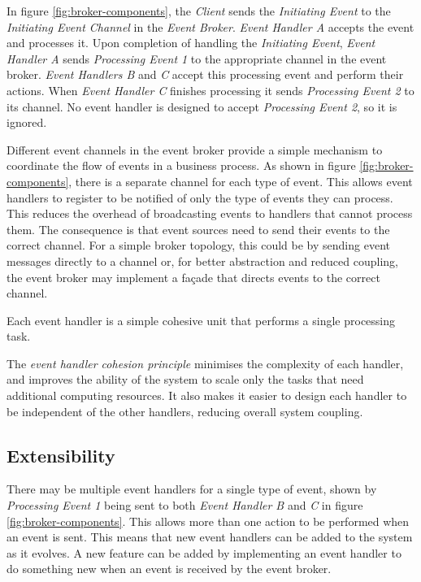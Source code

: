 In figure \ref{fig:broker-components}, the \emph{Client} sends the \emph{Initiating Event} to the \emph{Initiating Event Channel} in the \emph{Event Broker}.
\emph{Event Handler A} accepts the event and processes it.
Upon completion of handling the \emph{Initiating Event},
\emph{Event Handler A} sends \emph{Processing Event 1} to the appropriate channel in the event broker.
\emph{Event Handlers B} and \emph{C} accept this processing event and perform their actions.
When \emph{Event Handler C} finishes processing it sends \emph{Processing Event 2} to its channel.
No event handler is designed to accept \emph{Processing Event 2}, so it is ignored.

Different event channels in the event broker provide a simple mechanism to coordinate the flow of events in a business process.
As shown in figure \ref{fig:broker-components}, there is a separate channel for each type of event.
This allows event handlers to register to be notified of only the type of events they can process.
This reduces the overhead of broadcasting events to handlers that cannot process them.
The consequence is that event sources need to send their events to the correct channel.
For a simple broker topology, this could be by sending event messages directly to a channel
or, for better abstraction and reduced coupling, the event broker may implement a façade that directs events to the correct channel.

\begin{definition}\label{def:cohesion}
    Each event handler is a simple cohesive unit that performs a single processing task.
\end{definition}

The \emph{event handler cohesion principle} minimises the complexity of each handler,
and improves the ability of the system to scale only the tasks that need additional computing resources.
It also makes it easier to design each handler to be independent of the other handlers, reducing overall system coupling.

\subsection{Extensibility}\label{sec:extensibility}

There may be multiple event handlers for a single type of event,
shown by \emph{Processing Event 1} being sent to both \emph{Event Handler B} and \emph{C} in figure \ref{fig:broker-components}.
This allows more than one action to be performed when an event is sent.
This means that new event handlers can be added to the system as it evolves.
A new feature can be added by implementing an event handler to do something new when an event is received by the event broker.

